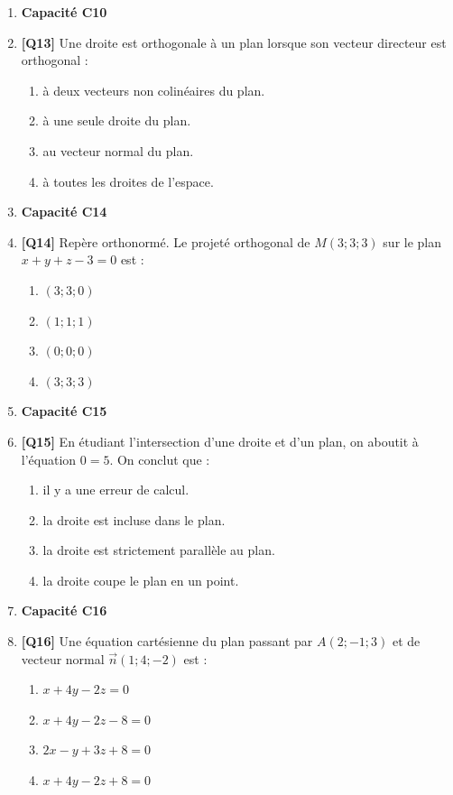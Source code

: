 \begin{enumerate}
\item[] \textbf{Capacité C10}

\item \textbf{[Q13]} Une droite est orthogonale à un plan lorsque son vecteur directeur est orthogonal :
  \begin{enumerate}[label=\Alph*.]
    \item à deux vecteurs non colinéaires du plan.
    \item à une seule droite du plan.
    \item au vecteur normal du plan.
    \item à toutes les droites de l'espace.
  \end{enumerate}

\item[] \textbf{Capacité C14}

\item \textbf{[Q14]} Repère orthonormé. Le projeté orthogonal de $M(3;3;3)$ sur le plan $x+y+z-3=0$ est :
  \begin{enumerate}[label=\Alph*.]
    \item $(3;3;0)$
    \item $(1;1;1)$
    \item $(0;0;0)$
    \item $(3;3;3)$
  \end{enumerate}

\item[] \textbf{Capacité C15}

\item \textbf{[Q15]} En étudiant l'intersection d'une droite et d'un plan, on aboutit à l'équation $0=5$. On conclut que :
  \begin{enumerate}[label=\Alph*.]
    \item il y a une erreur de calcul.
    \item la droite est incluse dans le plan.
    \item la droite est strictement parallèle au plan.
    \item la droite coupe le plan en un point.
  \end{enumerate}

\item[] \textbf{Capacité C16}

\item \textbf{[Q16]} Une équation cartésienne du plan passant par $A(2;-1;3)$ et de vecteur normal $\vec{n}(1;4;-2)$ est :
  \begin{enumerate}[label=\Alph*.]
    \item $x+4y-2z=0$
    \item $x+4y-2z-8=0$
    \item $2x-y+3z+8=0$
    \item $x+4y-2z+8=0$
  \end{enumerate}

\end{enumerate}

